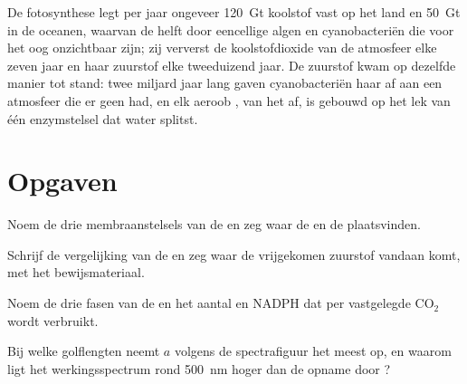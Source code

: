 \begin{example}\label{ex:b1:photosynthesis:global}
De fotosynthese legt per jaar ongeveer \qty{120}{Gt} koolstof vast op het land en
\qty{50}{Gt} in de oceanen, waarvan de helft door eencellige algen en
cyanobacteriën die voor het oog onzichtbaar zijn; zij ververst de koolstofdioxide
van de atmosfeer elke zeven jaar en haar zuurstof elke tweeduizend jaar. De
zuurstof kwam op dezelfde manier tot stand: twee miljard jaar lang gaven
cyanobacteriën haar af aan een atmosfeer die er geen had, en elk aeroob ,
van het  af, is gebouwd op het lek van één enzymstelsel dat water
splitst.
\end{example}

\section{Opgaven}

\begin{exercise}[$\star$]\label{exo:b1:photosynthesis:1}
Noem de drie membraanstelsels van de  en zeg waar de  en
de  plaatsvinden.
\end{exercise}

\begin{exercise}[$\star$]\label{exo:b1:photosynthesis:2}
Schrijf de vergelijking van de  en zeg waar de vrijgekomen zuurstof
vandaan komt, met het bewijsmateriaal.
\end{exercise}

\begin{exercise}[$\star$]\label{exo:b1:photosynthesis:3}
Noem de drie fasen van de  en het aantal  en NADPH dat per
vastgelegde $\mathrm{CO_2}$ wordt verbruikt.
\end{exercise}

\begin{exercise}[$\star$]\label{exo:b1:photosynthesis:4}
Bij welke golflengten neemt  $a$ volgens de spectrafiguur het meest op,
en waarom ligt het werkingsspectrum rond \qty{500}{nm} hoger dan de opname door
?
\end{exercise}

